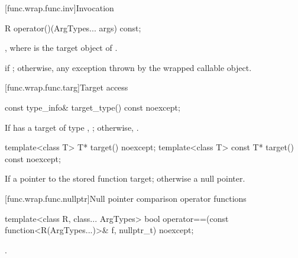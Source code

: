 [func.wrap.func.inv]{Invocation}

%
%
\begin{itemdecl}
R operator()(ArgTypes... args) const;
\end{itemdecl}

\begin{itemdescr}
\pnum
\returns
{},
where  is the target object of .

\pnum
\throws
{} if ; otherwise, any
exception thrown by the wrapped callable object.
\end{itemdescr}

[func.wrap.func.targ]{Target access}

%
\begin{itemdecl}
const type_info& target_type() const noexcept;
\end{itemdecl}

\begin{itemdescr}
\pnum
\returns
If  has a target of type ,
  ; otherwise, .
\end{itemdescr}

%
\begin{itemdecl}
template<class T>       T* target() noexcept;
template<class T> const T* target() const noexcept;
\end{itemdecl}

\begin{itemdescr}
\pnum
\returns
If 
a pointer to the stored function target; otherwise a null pointer.
\end{itemdescr}

[func.wrap.func.nullptr]{Null pointer comparison operator functions}

%
\begin{itemdecl}
template<class R, class... ArgTypes>
  bool operator==(const function<R(ArgTypes...)>& f, nullptr_t) noexcept;
\end{itemdecl}

\begin{itemdescr}
\pnum
\returns
{}.
\end{itemdescr}

